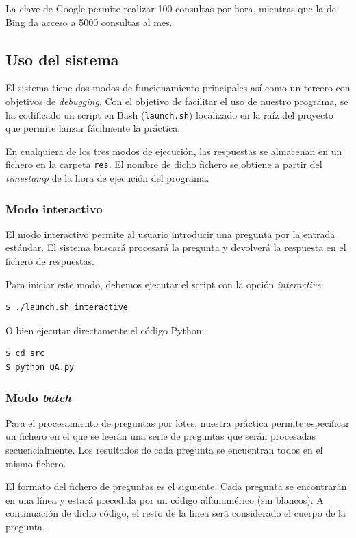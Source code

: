 \documentclass[12pt,a4paper,titlepage]{article}
\begin{document}
La clave de Google permite realizar 100 consultas por hora, mientras que la de Bing da acceso a 5000 consultas al mes.


\subsection{Uso del sistema}
El sistema tiene dos modos de funcionamiento principales así como un tercero con objetivos de \emph{debugging}. Con el objetivo de facilitar el uso de nuestro programa, se ha codificado un script en Bash (\texttt{launch.sh}) localizado en la raíz del proyecto que permite lanzar fácilmente la práctica.

En cualquiera de los tres modos de ejecución, las respuestas se almacenan en un fichero en la carpeta \texttt{res}. El nombre de dicho fichero se obtiene a partir del \emph{timestamp} de la hora de ejecución del programa.

\subsubsection{Modo interactivo}
El modo interactivo permite al usuario introducir una pregunta por la entrada estándar. El sistema buscará procesará la pregunta y devolverá la respuesta en el fichero de respuestas.

Para iniciar este modo, debemos ejecutar el script con la opción \emph{interactive}:
\begin{lstlisting}
$ ./launch.sh interactive
\end{lstlisting}

O bien ejecutar directamente el código Python:
\begin{lstlisting}
$ cd src
$ python QA.py
\end{lstlisting}

\subsubsection{Modo \emph{batch}}
Para el procesamiento de preguntas por lotes, nuestra práctica permite especificar un fichero en el que se leerán una serie de preguntas que serán procesadas secuencialmente. Los resultados de cada pregunta se encuentran todos en el mismo fichero.

El formato del fichero de preguntas es el siguiente. Cada pregunta se encontrarán en una línea y estará precedida por un código alfanumérico (sin blancos). A continuación de dicho código, el resto de la línea será considerado el cuerpo de la pregunta.
\end{document}
